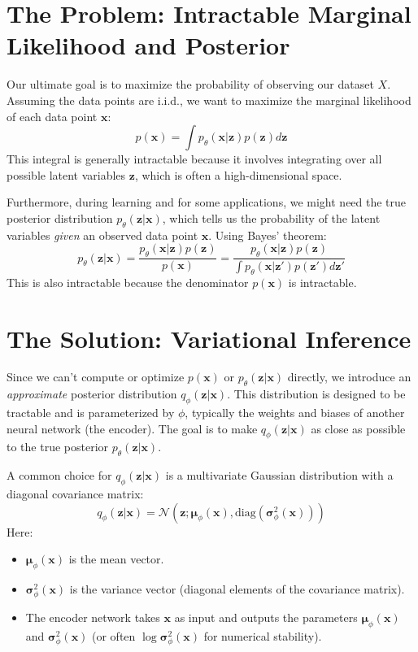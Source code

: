 \documentclass[11pt, letterpaper]{article}
\newcommand{\vx}{\boldsymbol{x}} %
\newcommand{\vz}{\boldsymbol{z}} %
\newcommand{\vmu}{\boldsymbol{\mu}} %
\newcommand{\vsigma}{\boldsymbol{\sigma}} %
\newcommand{\Ndist}{\mathcal{N}} %
\begin{document}
\section{The Problem: Intractable Marginal Likelihood and Posterior}

Our ultimate goal is to maximize the probability of observing our dataset $X$. Assuming the data points are i.i.d., we want to maximize the marginal likelihood of each data point $\vx$:
\begin{equation}
    p(\vx) = \int p_{\theta}(\vx|\vz) p(\vz) d\vz
\end{equation}
This integral is generally intractable because it involves integrating over all possible latent variables $\vz$, which is often a high-dimensional space.

Furthermore, during learning and for some applications, we might need the true posterior distribution $p_{\theta}(\vz|\vx)$, which tells us the probability of the latent variables \emph{given} an observed data point $\vx$. Using Bayes' theorem:
\begin{equation}
    p_{\theta}(\vz|\vx) = \frac{p_{\theta}(\vx|\vz) p(\vz)}{p(\vx)} = \frac{p_{\theta}(\vx|\vz) p(\vz)}{\int p_{\theta}(\vx|\vz') p(\vz') d\vz'}
\end{equation}
This is also intractable because the denominator $p(\vx)$ is intractable.

\section{The Solution: Variational Inference}

Since we can't compute or optimize $p(\vx)$ or $p_{\theta}(\vz|\vx)$ directly, we introduce an \emph{approximate} posterior distribution $q_{\phi}(\vz|\vx)$. This distribution is designed to be tractable and is parameterized by $\phi$, typically the weights and biases of another neural network (the encoder). The goal is to make $q_{\phi}(\vz|\vx)$ as close as possible to the true posterior $p_{\theta}(\vz|\vx)$.

A common choice for $q_{\phi}(\vz|\vx)$ is a multivariate Gaussian distribution with a diagonal covariance matrix:
\begin{equation}
    q_{\phi}(\vz|\vx) = \Ndist(\vz; \vmu_{\phi}(\vx), \text{diag}(\vsigma^2_{\phi}(\vx)))
\end{equation}
Here:
\begin{itemize}
    \item $\vmu_{\phi}(\vx)$ is the mean vector.
    \item $\vsigma^2_{\phi}(\vx)$ is the variance vector (diagonal elements of the covariance matrix).
    \item The encoder network takes $\vx$ as input and outputs the parameters $\vmu_{\phi}(\vx)$ and $\vsigma^2_{\phi}(\vx)$ (or often $\log \vsigma^2_{\phi}(\vx)$ for numerical stability).
\end{itemize}
\end{document}
